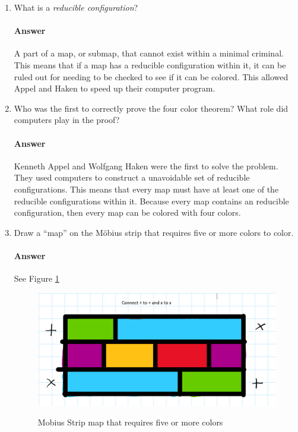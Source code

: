 \documentclass{article}
\begin{document}
\begin{enumerate}

    \item What is a \emph{reducible configuration}?

        \paragraph{Answer}

        A part of a map, or submap, that cannot exist within a minimal criminal. This means that if a map has a reducible configuration within it, it can be ruled out for needing to be checked to see if it can be colored. This allowed Appel and Haken to speed up their computer program.



    \item Who was the first to correctly prove the four color theorem?  What
        role did computers play in the proof?

        \paragraph{Answer}

        Kenneth Appel and Wolfgang Haken were the first to solve the problem. They used computers to construct a unavoidable set of reducible configurations. 
        This means that every map must have at least one of the reducible configurations within it. Because every map contains an reducible configuration, then every map can be
        colored with four colors.




    \item Draw a ``map'' on the M\"obius strip that requires five or more colors
        to color.

        \paragraph{Answer}
        See Figure \ref{mobius}

        \begin{figure}
\caption{Mobius Strip map that requires five or more colors}
\centering
\includegraphics[width=\textwidth]{images/mobius}
\label{mobius}
\end{figure}


\end{enumerate}
\end{document}

